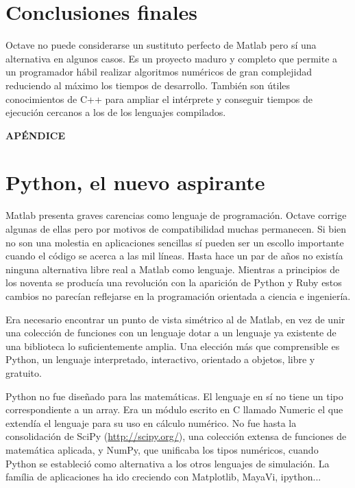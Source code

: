 \documentclass[10pt,letterpaper,conference]{ieeeconfspanish}
\begin{document}
\section*{Conclusiones finales}

Octave no puede considerarse un sustituto perfecto de Matlab pero sí
una alternativa en algunos casos.  Es un proyecto maduro y completo
que permite a un programador hábil realizar algoritmos numéricos de
gran complejidad reduciendo al máximo los tiempos de
desarrollo. También son útiles conocimientos de C++ para ampliar el
intérprete y conseguir tiempos de ejecución cercanos a los de los
lenguajes compilados.


\begin{center}
    {\bf APÉNDICE}
\end{center}

\section*{Python, el nuevo aspirante}

Matlab presenta graves carencias como lenguaje de programación.
Octave corrige algunas de ellas pero por motivos de compatibilidad
muchas permanecen.  Si bien no son una molestia en aplicaciones
sencillas sí pueden ser un escollo importante cuando el código se
acerca a las mil líneas.  Hasta hace un par de años no existía ninguna
alternativa libre real a Matlab como lenguaje.  Mientras a principios
de los noventa se producía una revolución con la aparición de Python y
Ruby estos cambios no parecían reflejarse en la programación orientada
a ciencia e ingeniería.

Era necesario encontrar un punto de vista simétrico al de Matlab, en
vez de unir una colección de funciones con un lenguaje dotar a un
lenguaje ya existente de una biblioteca lo suficientemente amplia. Una
elección más que comprensible es Python, un lenguaje interpretado,
interactivo, orientado a objetos, libre y gratuito.

Python no fue diseñado para las matemáticas.  El lenguaje en sí no
tiene un tipo correspondiente a un array. Era un módulo escrito en C
llamado Numeric el que extendía el lenguaje para su uso en cálculo
numérico.  No fue hasta la consolidación de SciPy
(\url{http://scipy.org/}), una colección extensa de funciones de
matemática aplicada, y NumPy, que unificaba los tipos numéricos,
cuando Python se estableció como alternativa a los otros lenguajes de
simulación.  La família de aplicaciones ha ido creciendo con
Matplotlib, MayaVi, ipython...
\end{document}
